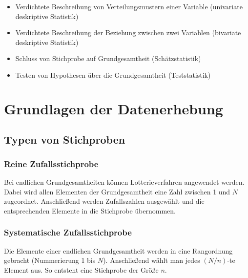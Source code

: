 \documentclass[
  11pt,
  ngerman,
  a4paper,
]{report}
\providecommand{\tightlist}{%
  \setlength{\itemsep}{0pt}\setlength{\parskip}{0pt}}
\begin{document}
\begin{itemize}
\tightlist
\item
  Verdichtete Beschreibung von Verteilungsmustern einer Variable (univariate deskriptive Statistik)
\item
  Verdichtete Beschreibung der Beziehung zwischen zwei Variablen (bivariate deskriptive Statistik)
\item
  Schluss von Stichprobe auf Grundgesamtheit (Schätzstatistik)
\item
  Testen von Hypothesen über die Grundgesamtheit (Teststatistik)
\end{itemize}

\hypertarget{grundlagen-der-datenerhebung}{%
\section{Grundlagen der Datenerhebung}\label{grundlagen-der-datenerhebung}}

\nopagebreak

\hypertarget{typen-von-stichproben}{%
\subsection{Typen von Stichproben}\label{typen-von-stichproben}}

\nopagebreak

\hypertarget{reine-zufallsstichprobe}{%
\subsubsection{Reine Zufallsstichprobe}\label{reine-zufallsstichprobe}}

Bei endlichen Grundgesamtheiten können Lotterieverfahren angewendet werden. Dabei wird allen Elementen der Grundgesamtheit eine Zahl zwischen 1 und \(N\) zugeordnet. Anschließend werden Zufallszahlen ausgewählt und die entsprechenden Elemente in die Stichprobe übernommen.

\hypertarget{systematische-zufallsstichprobe}{%
\subsubsection{Systematische Zufallsstichprobe}\label{systematische-zufallsstichprobe}}

Die Elemente einer endlichen Grundgesamtheit werden in eine Rangordnung gebracht (Nummerierung 1 bis \(N\)). Anschließend wählt man jedes \((N/n)\)-te Element aus. So entsteht eine Stichprobe der Größe \(n\).
\end{document}
